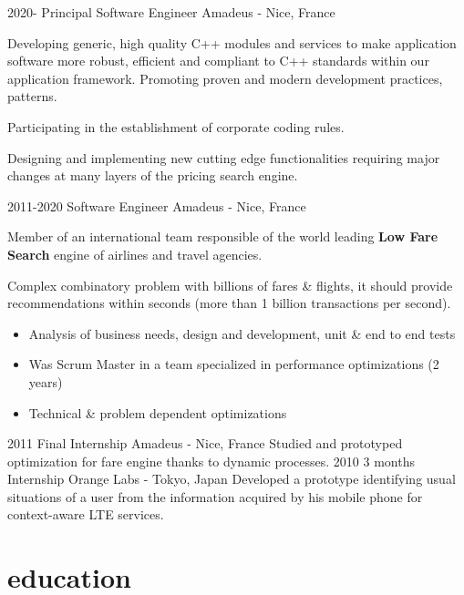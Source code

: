 \documentclass[]{twentysecondcv}
\begin{document}
\begin{twenty}
  \twentyitem
    {2020-}
    {Principal Software Engineer}
    {Amadeus - Nice, France}
    {Developing generic, high quality C++ modules and services to make application software more robust, efficient and compliant to C++ standards within our application framework.
Promoting proven and modern development practices, patterns.

Participating in the establishment of corporate coding rules.

Designing and implementing new cutting edge functionalities requiring major changes at many layers of the pricing search engine.
}
  \twentyitem
    {2011-2020}
    {Software Engineer}
    {Amadeus - Nice, France}
    {Member of an international team responsible of the world leading \textbf{Low Fare Search} engine of airlines and travel agencies. 
    
Complex combinatory problem with billions of fares \& flights, it should provide recommendations within seconds (more than 1 billion transactions per second).  

\begin{itemize}
  \item Analysis of business needs, design and development, unit \& end to end tests
  \item Was Scrum Master in a team specialized in performance optimizations (2 years)
  \item Technical \& problem dependent optimizations
\end{itemize}
}
  \twentyitem
    {2011}
    {Final Internship}
    {Amadeus - Nice, France}
    {Studied and prototyped optimization for fare engine thanks to dynamic processes.}
  \twentyitem
    {2010}
    {3 months Internship}
    {Orange Labs - Tokyo, Japan}
    {Developed a prototype identifying usual situations of a user from the information acquired by his mobile phone for context-aware LTE services.}

\end{twenty}

\section{education}
\end{document}
